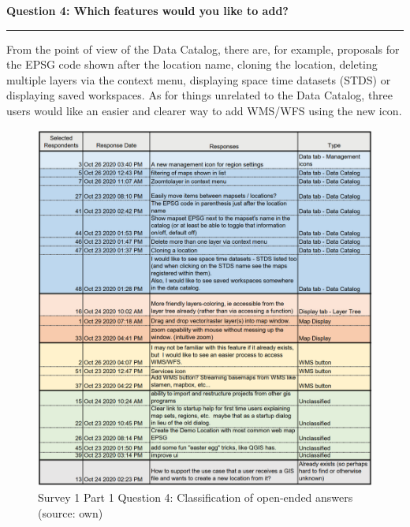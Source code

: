 \documentclass[a4paper,10pt,twoside]{article}
\begin{document}
\newpage
\noindent \textbf{Question 4: Which features would you like to add?}
\par\noindent\rule{\textwidth}{0.4pt}
\noindent From the point of view of the Data Catalog, there are, for example, proposals for the EPSG code shown after the location name, cloning the location, deleting multiple layers via the context menu, displaying space time datasets (STDS) or displaying saved workspaces. As for things unrelated to the Data Catalog, three users would like an easier and clearer way to add WMS/WFS using the new icon.

\begin{figure}[hbt!] 
\begin{center}
\includegraphics[width=16cm]{../surveys/analyzed_data/survey1_part1_question4_open_ended.png} 
\caption[Survey 1 Part 1 Question 4: Classification of open-ended answers]{Survey 1 Part 1 Question 4: Classification of open-ended answers (source: own)}
\label{fig:survey1_part1_question4_open_ended}
\end{center}
\end{figure}
\end{document}
